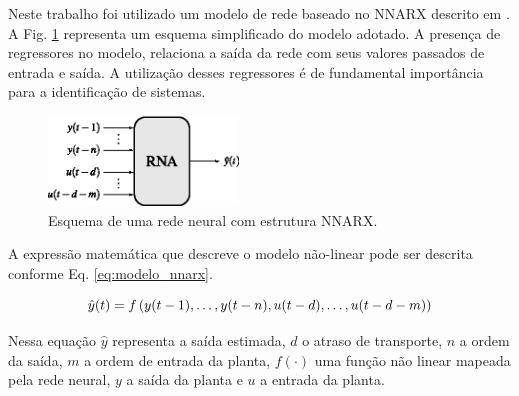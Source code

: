 
Neste trabalho foi utilizado um modelo de rede baseado no NNARX descrito em
. A Fig. \ref{fig:nnarx} representa um esquema
simplificado do modelo adotado. A presença de regressores no modelo, relaciona a
saída da rede com seus valores passados de entrada e saída. A utilização desses
regressores é de fundamental importância para a identificação de sistemas.

\begin{figure}[htb]
\centering
\includegraphics[width=0.45\textwidth]{imgs/rnas/eps/nnarx}
\caption{Esquema de uma rede neural com estrutura NNARX.}
\label{fig:nnarx}
\end{figure}


A expressão matemática que descreve o modelo não-linear pode ser descrita
conforme Eq. \ref{eq:modelo_nnarx}.

\begin{equation}
\label{eq:modelo_nnarx}
\hat{y}(t) = f\left(y(t-1), \ldots, y(t-n), u(t-d), \ldots, u(t-d-m)\right)
\end{equation}


Nessa equação $\hat{y}$ representa a saída estimada, $d$ o atraso de transporte,
$n$ a ordem da saída, $m$ a ordem de entrada da planta, $f( \cdotp )$ uma função
não linear mapeada pela rede neural, $y$ a saída da planta e $u$ a entrada da
planta.

